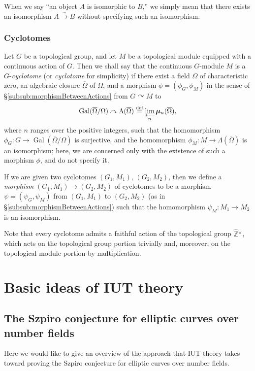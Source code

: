 \documentclass[12pt, reqno, a4paper]{amsart}
\def\ovl#1{\overline{#1}} %
\def\eqdef{\stackrel{\textrm{def}}{=}} %
\def\simto{\stackrel{\sim}{\rightarrow}} %
\def\acton{\curvearrowright} %
\def\bmu{\bm{\mu}}
\DeclareMathOperator{\Gal}{Gal}
\begin{document}
\subsubsection{}\label{subsub:isomorphs}
When we say ``an object $A$ is isomorphic to $B$,'' we simply mean that there exists an isomorphism $A\simto B$ without specifying such an isomorphism. 

\subsubsection{Cyclotomes}\label{subsub:cyclotomes}
Let $G$ be a topological group, and let $M$ be a topological module equipped with a continuous action of $G$.  Then we shall say that the continuous $G$-module $M$ is a $G$-\textit{cyclotome} (or \textit{cyclotome} for simplicity) if there exist a field $\Omega$ of characteristic zero, an algebraic closure $\overline{\Omega}$ of $\Omega$, and a morphism $\phi = (\phi_G, \phi_M)$ in the sense of \S\ref{subsub:morphismBetweenActions} from $G \acton M$ to 
$$
\Gal(\overline{\Omega} / \Omega) \acton \Lambda(\ovl{\Omega}) \eqdef \varprojlim_{n} \bmu_n(\ovl{\Omega}),
$$
where $n$ ranges over the positive integers, such that the homomorphism $\phi_G \colon G \to \Gal(\overline{\Omega} / \Omega)$ is surjective, and the homomorphism $\phi_M\colon M \to \Lambda(\ovl{\Omega})$ is an isomorphism; here, we are concerned only with the existence of such a morphism $\phi$, and do not specify it. 

If we are given two cyclotomes $(G_1, M_1)$, $(G_2, M_2)$, then we define a {\it morphism} $(G_1, M_1) \to (G_2, M_2)$ of cyclotomes to be a morphism $\psi = (\psi_G, \psi_M)$ from $(G_1, M_1)$ to $(G_2, M_2)$ (as in \S\ref{subsub:morphismBetweenActions}) such that the homomorphism $\psi_M\colon M_1 \to M_2$ is an isomorphism.

Note that every cyclotome admits a faithful action of the topological group $\widehat{\mathbb{Z}}{}^\times$, which acts on the topological group portion trivially and, moreover, on the topological module portion by multiplication.  


\setcounter{equation}{0}
\section{Basic ideas of IUT theory}\label{sec:whatIsIUTtheory}

\subsection{The Szpiro conjecture for elliptic curves over number fields}\label{sub:SzpiroConjecture}
Here we would like to give an overview of the approach that IUT theory takes toward proving the Szpiro conjecture for elliptic curves over number fields.
\end{document}
